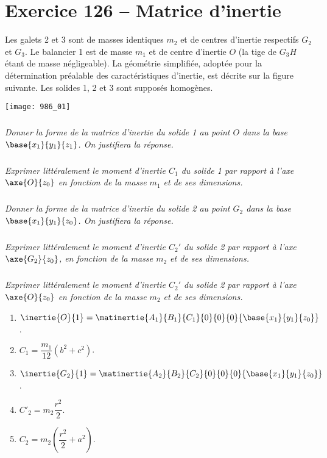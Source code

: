 \section*{Exercice 126 -- Matrice d'inertie}
\setcounter{exo}{0}

Les galets 2 et 3 sont de masses identiques $m_2$ et de centres d’inertie respectifs $G_2$ et $G_3$. Le balancier 1 est
de masse $m_1$ et de centre d’inertie $O$ (la tige de $G_3H$ étant de masse négligeable). La géométrie simplifiée,
adoptée pour la détermination préalable des caractéristiques d'inertie, est décrite sur la figure suivante.
Les solides 1, 2 et 3 sont supposés homogènes.

\begin{center}
\texttt{[image: 986\_01]}%
\end{center}


\subparagraph{}
\textit{Donner la forme de la matrice d’inertie du solide 1 au point $O$ dans la base
$\base{x_1}{y_1}{z_1}$. On justifiera la réponse.}
\ifprof
\begin{corrige}
\end{corrige}
\else
\fi

\subparagraph{}
\textit{Exprimer littéralement le moment d’inertie $C_1$ du solide 1 par rapport à l’axe $\axe{O}{z_0}$
 en fonction de la masse $m_1$ et de ses dimensions.}
\ifprof
\begin{corrige}
\end{corrige}
\else
\fi

\subparagraph{}
\textit{Donner la forme de la matrice d’inertie du solide 2 au point $G_2$ dans la base $\base{x_1}{y_1}{z_0}$. On justifiera la réponse.}
\ifprof
\begin{corrige}
\end{corrige}
\else
\fi

\subparagraph{}
\textit{Exprimer littéralement le moment d’inertie $C_2'$ du solide 2 par rapport à l’axe $\axe{G_2}{z_0}$, en fonction de la masse $m_2$ et de ses dimensions.}
\ifprof
\begin{corrige}
\end{corrige}
\else
\fi

\subparagraph{}
\textit{Exprimer littéralement le moment d’inertie $C_2'$ du solide 2 par rapport à l’axe $\axe{O}{z_0}$ en fonction de la masse $m_2$ et de ses dimensions.}
\ifprof
\begin{corrige}
\end{corrige}
\else
\fi
%

\begin{enumerate}
\item $\inertie{O}{1}=\matinertie{A_1}{B_1}{C_1}{0}{0}{0}{\base{x_1}{y_1}{z_0}}$.
\item $C_1 = \dfrac{m_1}{12}\left( b^2 + c^2\right)$.
\item $\inertie{G_2}{1}=\matinertie{A_2}{B_2}{C_2}{0}{0}{0}{\base{x_1}{y_1}{z_0}}$.
\item $C'_2 = m_2 \dfrac{r^2}{2}$.
\item $C_2 = m_2\left(\dfrac{r^2}{2}+a^2\right)$.
\end{enumerate}
